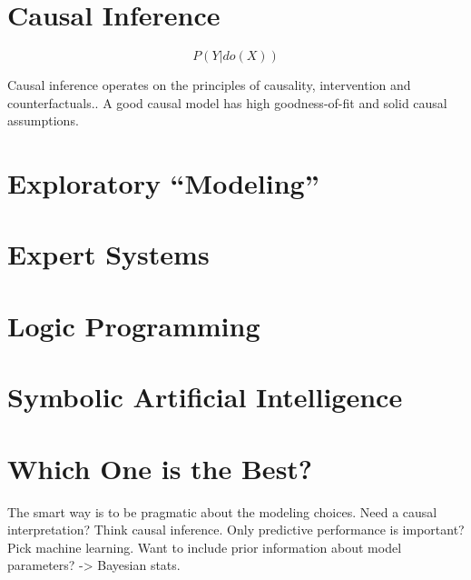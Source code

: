 \documentclass[
  14pt,
]{article}
\begin{document}
\hypertarget{causal-inference}{%
\section{Causal Inference}\label{causal-inference}}

\[P(Y|do(X))\]

Causal inference operates on the principles of causality, intervention and counterfactuals..
A good causal model has high goodness-of-fit and solid causal assumptions.

\hypertarget{exploratory-modeling}{%
\section{Exploratory ``Modeling''}\label{exploratory-modeling}}

\hypertarget{expert-systems}{%
\section{Expert Systems}\label{expert-systems}}

\hypertarget{logic-programming}{%
\section{Logic Programming}\label{logic-programming}}

\hypertarget{symbolic-artificial-intelligence}{%
\section{Symbolic Artificial Intelligence}\label{symbolic-artificial-intelligence}}

\hypertarget{which-one-is-the-best}{%
\section{Which One is the Best?}\label{which-one-is-the-best}}

The smart way is to be pragmatic about the modeling choices. Need a causal interpretation? Think causal inference. Only predictive performance is important? Pick machine learning. Want to include prior information about model parameters? -\textgreater{} Bayesian stats.
\end{document}
